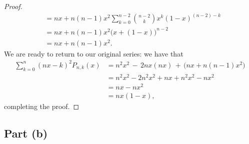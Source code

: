 \documentclass[11pt]{article}
\begin{document}
\begin{proof}
\begin{align*}
                                                 &= nx + n(n - 1)x^{2} \sum\limits_{k = 0}^{n - 2} \binom{n - 2}{k} x^{k} (1 - x)^{(n - 2) - k} \\
                                                       &= nx + n(n - 1)x^{2} \big( x + (1 - x) \big)^{n - 2} \\
                                                       &= nx + n(n - 1)x^{2}. 
  \end{align*}
  We are ready to return to our original series: we have that
  \begin{align*}
    \sum\limits_{k = 0}^{n} (nx - k)^{2} P_{n, k}(x) &= n^{2}x^{2} \, - \, 2nx (nx) \, + \, \big( nx + n(n - 1)x^{2} \big) \\
                                                     &= n^{2}x^{2} - 2n^{2}x^{2} + nx + n^{2}x^{2} - nx^{2} \\
                                                     &= nx - nx^{2} \\
                                                     &= nx(1 - x),
  \end{align*}
  completing the proof.
\end{proof}


\subsection{Part (b)}
\end{document}
